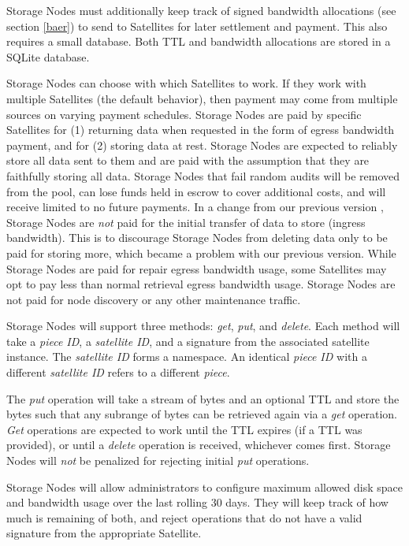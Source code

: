\documentclass[8pt,fleqn,openany]{book}
\newcommand{\code}[1]{{\em #1}}
\begin{document}
Storage Nodes must additionally keep track of signed bandwidth allocations
(see section \ref{baer}) to send to
Satellites for later settlement and payment. This also requires a small
database. Both TTL and bandwidth allocations are stored in a SQLite
\cite{sqlite} database.

Storage Nodes can choose with which Satellites to work. If they work
with multiple Satellites (the default behavior), then payment may come from
multiple sources on varying payment schedules.
Storage Nodes are paid by specific Satellites for (1) returning data when
requested in
the form of egress bandwidth payment, and for (2) storing data at rest.
Storage Nodes are expected to reliably store all data sent to them and are
paid with the assumption that they are faithfully storing all data.
Storage Nodes that fail random audits will be removed from the pool, can lose
funds held in escrow to cover additional costs, and will
receive
limited to no future payments.
In a change from our previous version \cite{storj-v2},
Storage Nodes are {\em not} paid for the initial transfer of data to store
(ingress bandwidth).
This is to discourage Storage Nodes from deleting data only to be paid for
storing more, which became a problem with our previous version.
While Storage Nodes are paid for repair egress bandwidth usage,
some Satellites may opt to pay less than normal retrieval egress bandwidth
usage.
Storage Nodes are not paid for node discovery or any other maintenance traffic.

Storage Nodes will support three methods: \code{get}, \code{put}, and
\code{delete}.
Each method will take a {\em piece ID}, a {\em satellite ID}, and a signature
from the associated satellite instance.
The {\em satellite ID} forms a namespace. An identical {\em piece ID} with a
different {\em satellite ID} refers to a different {\em piece}.

The \code{put} operation will take a stream of bytes and an optional TTL and
store the bytes such
that any subrange of bytes can be retrieved again via a \code{get} operation.
\code{Get} operations are expected to work until the TTL expires (if a TTL was
provided), or until a \code{delete} operation is received, whichever comes
first.
Storage Nodes will {\em not} be penalized for rejecting initial \code{put}
operations.

Storage Nodes will allow administrators to configure maximum allowed disk
space and bandwidth usage over the last rolling 30 days.
They will keep track of how much is remaining of both, and reject operations
that do not have a valid signature from the appropriate Satellite.
\end{document}
